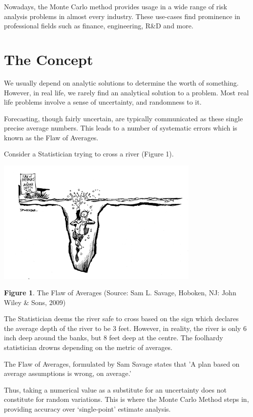 \documentclass{resonance}
\begin{document}
	Nowadays, the Monte Carlo method provides usage in a wide range of risk analysis problems in almost every industry. These use-cases find prominence in professional fields such as finance, engineering, R\&D and more.
	
	\section{The Concept}
	We usually depend on analytic solutions to determine the worth of something. However, in real life, we rarely find an analytical solution to a problem. Most real life problems involve a sense of uncertainty, and randomness to it.
	
	Forecasting, though fairly uncertain, are typically communicated as these single precise average numbers. This leads to a number of systematic errors which is known as the Flaw of Averages.
	
	Consider a Statistician trying to cross a river (Figure 1).
	
	\includegraphics[width=10cm]{the-flaw-of-averages}
	
	\scriptsize{\textbf{Figure 1}. The Flaw of Averages (Source: Sam L. Savage, Hoboken, NJ: John Wiley \& Sons, 2009)}
	
	\normalsize
	The Statistician deems the river safe to cross based on the sign which declares the average depth of the river to be 3 feet. However, in reality, the river is only 6 inch deep around the banks, but 8 feet deep at the centre. The foolhardy statistician drowns depending on the metric of averages. 
	
	The Flaw of Averages, formulated by Sam Savage states that 'A plan based on average assumptions is wrong, on average.'
	
	Thus, taking a numerical value as a substitute for an uncertainty does not constitute for random variations. This is where the Monte Carlo Method steps in, providing accuracy over ‘single-point’ estimate analysis.
	
\end{document}
